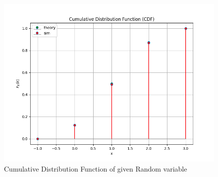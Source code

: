 \documentclass[journal]{IEEEtran}
\begin{document}
\begin{enumerate}
\begin{figure}[h!]
   \includegraphics[width=\columnwidth]{figs/cdf.png}
    \caption{Cumulative Distribution Function of given Random variable}
\end{figure}
\end{enumerate}
\end{document}
